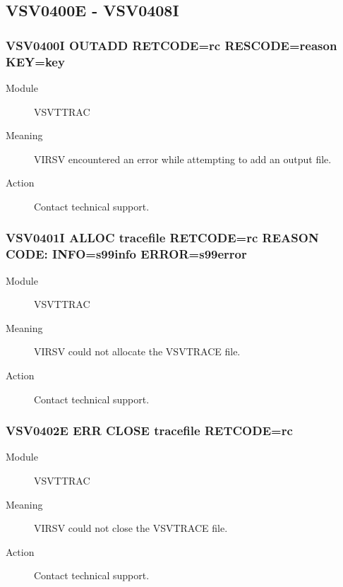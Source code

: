 \documentclass[letterpaper,10pt,english]{sphinxmanual}
\begin{document}
\subsection{VSV0400E - VSV0408I}
\label{\detokenize{messages:vsv0400e-vsv0408i}}

\subsubsection{VSV0400I OUTADD RETCODE=rc RESCODE=reason KEY=key}
\label{\detokenize{messages:vsv0400i-outadd-retcode-rc-rescode-reason-key-key}}\begin{description}
\item[{Module}] \leavevmode
VSVTTRAC

\item[{Meaning}] \leavevmode
VIRSV encountered an error while attempting to add an output file.

\item[{Action}] \leavevmode
Contact technical support.

\end{description}


\subsubsection{VSV0401I ALLOC tracefile RETCODE=rc REASON CODE: INFO=s99info ERROR=s99error}
\label{\detokenize{messages:vsv0401i-alloc-tracefile-retcode-rc-reason-code-info-s99info-error-s99error}}\begin{description}
\item[{Module}] \leavevmode
VSVTTRAC

\item[{Meaning}] \leavevmode
VIRSV could not allocate the VSVTRACE file.

\item[{Action}] \leavevmode
Contact technical support.

\end{description}


\subsubsection{VSV0402E ERR CLOSE tracefile RETCODE=rc}
\label{\detokenize{messages:vsv0402e-err-close-tracefile-retcode-rc}}\begin{description}
\item[{Module}] \leavevmode
VSVTTRAC

\item[{Meaning}] \leavevmode
VIRSV could not close the VSVTRACE file.

\item[{Action}] \leavevmode
Contact technical support.

\end{description}
\end{document}
